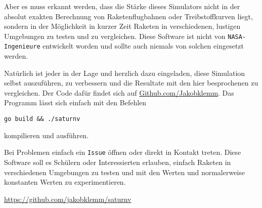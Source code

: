 \documentclass[11pt]{article}
\begin{document}
Aber es muss erkannt werden, dass die Stärke dieses Simulators nicht in der
absolut exakten Berechnung von Raketenflugbahnen oder Treibstoffkurven liegt,
sondern in der Möglichkeit in kurzer Zeit Raketen in verschiedenen, lustigen
Umgebungen zu testen und zu vergleichen. Diese Software ist nicht von
\texttt{NASA-Ingenieure} entwickelt worden und sollte auch niemals von solchen eingesetzt
werden.

Natürlich ist jeder in der Lage und herzlich dazu eingeladen, diese Simulation
selbst auszuführen, zu verbessern und die Resultate mit den hier besprochenen zu
vergleichen. Der Code dafür findet sich auf \href{https:github.com/jakobklemm/saturnv}{Github.com/Jakobklemm}. Das Programm
lässt sich einfach mit den Befehlen
\begin{verbatim}
go build && ./saturnv
\end{verbatim}
kompilieren und ausführen.

Bei Problemen einfach ein \texttt{Issue} öffnen oder direkt in Kontakt treten. Diese
Software soll es Schülern oder Interessierten erlauben, einfach Raketen in
verschiedenen Umgebungen zu testen und mit den Werten und normalerweise
konstanten Werten zu experimentieren.

\url{https://github.com/jakobklemm/saturnv}
\end{document}
